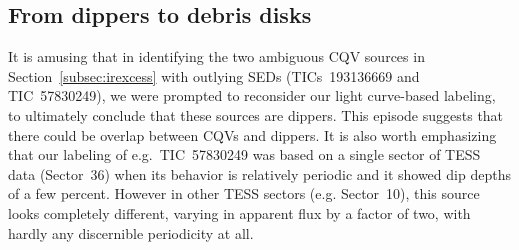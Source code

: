 \documentclass[11pt,twocolumn,tighten]{aastex63}
\begin{document}





\subsection{From dippers to debris disks}
\label{subsec:discdippers}

It is amusing that in identifying the two ambiguous CQV sources in
Section~\ref{subsec:irexcess} with outlying SEDs (TICs~193136669 and
TIC~57830249), we were prompted to reconsider our light curve-based
labeling, to
ultimately conclude that these sources are dippers.  This episode
suggests that there could be overlap between CQVs and dippers.  It is also worth emphasizing that our labeling of
e.g.~TIC~57830249 was based on a single sector of TESS data
(Sector~36) when its behavior is relatively periodic and it showed
dip depths of a few percent.  However in other TESS sectors
(e.g. Sector~10), this source looks completely different, varying in
apparent flux by a factor of two, with hardly any discernible
periodicity at all.
\end{document}
